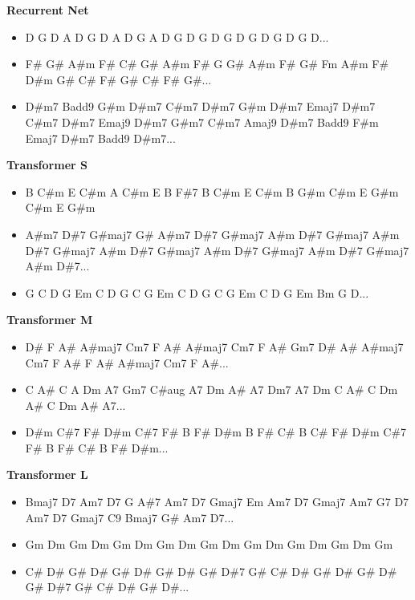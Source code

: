 \documentclass{article}
\begin{document}
\noindent \textbf{Recurrent Net}

\begin{itemize}[noitemsep,topsep=0pt]
    \item D G D A D G D A D G A D G D G D G D G D G D G D...
    \item F\# G\# A\#m F\# C\# G\# A\#m F\# G G\# A\#m F\# G\# Fm A\#m F\# D\#m G\# C\# F\# G\# C\# F\# G\#...
    \item D\#m7 Badd9 G\#m D\#m7 C\#m7 D\#m7 G\#m D\#m7 Emaj7 D\#m7 C\#m7 D\#m7 Emaj9 D\#m7 G\#m7 C\#m7 Amaj9 D\#m7 Badd9 F\#m Emaj7 D\#m7 Badd9 D\#m7...
\end{itemize}

\noindent \textbf{Transformer S}

\begin{itemize}[noitemsep,topsep=0pt]
    \item B C\#m E C\#m A C\#m E B F\#7 B C\#m E C\#m B G\#m C\#m E G\#m C\#m E G\#m
    \item A\#m7 D\#7 G\#maj7 G\# A\#m7 D\#7 G\#maj7 A\#m D\#7 G\#maj7 A\#m D\#7 G\#maj7 A\#m D\#7 G\#maj7 A\#m D\#7 G\#maj7 A\#m D\#7 G\#maj7 A\#m D\#7...
    \item G C D G Em C D G C G Em C D G C G Em C D G Em Bm G D...
\end{itemize}

\noindent \textbf{Transformer M}

\begin{itemize}[noitemsep,topsep=0pt]
    \item D\# F A\# A\#maj7 Cm7 F A\# A\#maj7 Cm7 F A\# Gm7 D\# A\# A\#maj7 Cm7 F A\# F A\# A\#maj7 Cm7 F A\#...
    \item C A\# C A Dm A7 Gm7 C\#aug A7 Dm A\# A7 Dm7 A7 Dm C A\# C Dm A\# C Dm A\# A7...
    \item D\#m C\#7 F\# D\#m C\#7 F\# B F\# D\#m B F\# C\# B C\# F\# D\#m C\#7 F\# B F\# C\# B F\# D\#m...
\end{itemize}

\noindent \textbf{Transformer L}

\begin{itemize}[noitemsep,topsep=0pt]
    \item Bmaj7 D7 Am7 D7 G A\#7 Am7 D7 Gmaj7 Em Am7 D7 Gmaj7 Am7 G7 D7 Am7 D7 Gmaj7 C9 Bmaj7 G\# Am7 D7...
    \item Gm Dm Gm Dm Gm Dm Gm Dm Gm Dm Gm Dm Gm Dm Gm Dm Gm
    \item C\# D\# G\# D\# G\# D\# G\# D\# G\# D\#7 G\# C\# D\# G\# D\# G\# D\# G\# D\#7 G\# C\# D\# G\# D\#...
\end{itemize}
\end{document}
